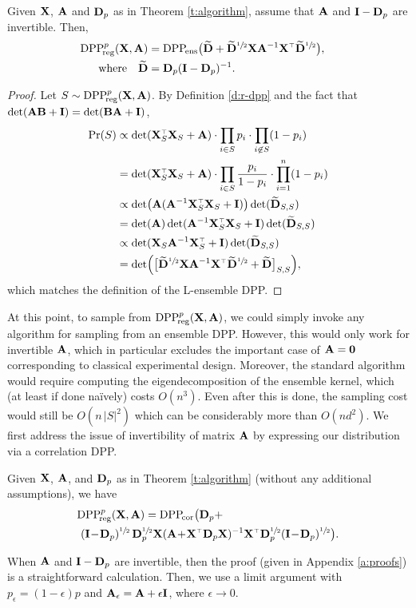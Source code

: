 \documentclass[thesis.tex]{subfiles}
\begin{document}
\vspace{2mm}
\begin{lemma}\label{t:reduction}
  Given $\mathbf X$, $\mathbf A$ and $\mathbf D_p$ as in Theorem \ref{t:algorithm}, assume that $\mathbf A$ and $\mathbf I-\mathbf D_p$ are
  invertible. Then,
  \begin{align*}
    \DPPreg{p}(\X,\A)&=\DPPens\big(\Dbt+
    \Dbt^{\sfrac12}\X\A^{-1}\X^\top
    \Dbt^{\sfrac12}\big),\quad\\
    \text{where}
    \quad\Dbt &= \D_p(\I-\D_p)^{-1}.
  \end{align*}
\end{lemma}
\begin{proof}
  Let $S\sim {{\mathrm{DPP}}_{\!\mathrm{reg}}^{p}}(\mathbf X,\mathbf A)$. By Definition \ref{d:r-dpp} and
  the fact that $\det(\mathbf A\mathbf B+\mathbf I)=\det(\mathbf B\mathbf A+\mathbf I)$,
  \begin{align*}
    \Pr(S) &\propto \det(\X_S^\top\X_S+\A)\cdot
\prod_{i\in S}p_i\cdot\prod_{i\not\in S}(1-p_i) \\
&= \det(\X_S^\top\X_S+\A)\cdot
\prod_{i\in S}\frac{p_i}{1-p_i}\cdot\prod_{i=1}^n(1-p_i)
\\ &\propto\det\!\big(\A(\A^{-1}\X_S^\top\X_S+\I)\big) \det(\Dbt_{S,S}) \\
     &=\det(\A)\det(\A^{-1}\X_S^\top\X_S+\I) \det(\Dbt_{S,S})
\\ &\propto \det(\X_S \A^{-1}\X_S^\top+\I) \det(\Dbt_{S,S}) \\
&=\det\!\Big(\big[\Dbt^{\sfrac12}\X \A^{-1}\X^\top\Dbt^{\sfrac12}+\Dbt\big]_{S,S}\Big),
  \end{align*}
which matches the definition of the L-ensemble DPP.
\end{proof}
 At this point, to sample from  ${{\mathrm{DPP}}_{\!\mathrm{reg}}^{p}}(\mathbf X,\mathbf A)$, we could simply
invoke any algorithm for sampling from
an ensemble DPP. However, this would only work for invertible
$\mathbf A$, which in particular excludes the important case of
$\mathbf A=\mathbf 0$ corresponding to classical experimental
design. Moreover, the standard algorithm would require computing the
eigendecomposition of the ensemble kernel, which (at
least if done na\"ively) costs $O(n^3)$. Even after this is done, the
sampling cost would still be $O(n\,|S|^2)$ which can be considerably
more than $O(nd^2)$. We first address the issue of invertibility of matrix
$\mathbf A$ by expressing our distribution via a correlation DPP.
\begin{lemma}\label{l:correlation}
  Given $\mathbf X$, $\mathbf A$, and $\mathbf D_p$ as in Theorem \ref{t:algorithm} (without
  any additional assumptions), we have
  \begin{align*}
    &\DPPreg{p}(\X,\A) 
    = \DPPcor\big(\D_p + \\
    &\ (\I\!-\!\D_p)^{\sfrac12}\,\D_p^{\sfrac12}\X(\A\!+\!\X^\top\D_p\X)^{-1}\X^\top\D_p^{\sfrac12}(\I\!-\!\D_p)^{\sfrac12}\big).
    \end{align*}
  \end{lemma}
  When $\mathbf A$ and $\mathbf I-\mathbf D_p$ are invertible, then the proof (given in
  Appendix \ref{a:proofs}) is a straightforward calculation.
Then, we use a limit argument with $p_\epsilon=(1-\epsilon)p$ and
$\mathbf A_\epsilon=\mathbf A+\epsilon\mathbf I$, where $\epsilon\rightarrow 0$.
\end{document}
